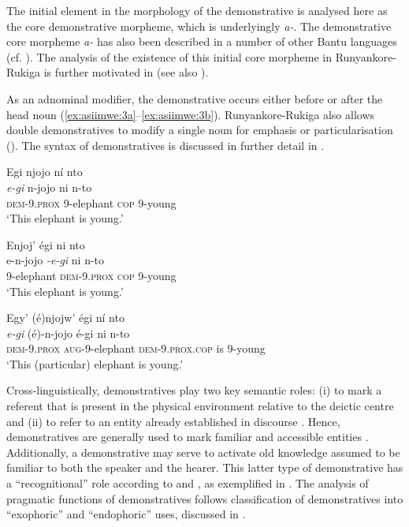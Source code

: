 \documentclass[output=paper 		  ]{langscibook}
\begin{document}
The initial element in the morphology of the demonstrative is analysed here as the core demonstrative morpheme, which is underlyingly \textit{a-}. The demonstrative core morpheme \textit{a-} has also been described in a number of other Bantu languages (cf. \citealt{Wald1973, DuPlessisEtAl1992, Visser2008}). The analysis of the existence of this initial core morpheme in Run\-yan\-ko\-re-Ru\-ki\-ga is further motivated in  (see also \citealt{Asiimwe2014,Asiimwe2016}).


\largerpage
As an adnominal modifier, the demonstrative occurs either before or after the head noun (\ref{ex:asiimwe:3a}--\ref{ex:asiimwe:3b}). Run\-yan\-ko\-re-Ru\-ki\-ga also allows double demonstratives to modify a single noun  for emphasis or particularisation (). The syntax of demonstratives is discussed in further detail in .

\ea%
    \label{ex:asiimwe:3}

    \ea\label{ex:asiimwe:3a} Egi njojo ní nto\\
    \gll \emph{e-gi}  n-jojo  ni  n-to\\
    \textsc{dem}{}-9.\textsc{prox}  9-elephant  \textsc{cop}  9-young\\
  \glt ‘This elephant is young.’

  \ex\label{ex:asiimwe:3b} Enjoj’ égi ni nto\\
    \gll e-n-jojo  \emph{{}-e-gi}  ni  n-to\\
    9-elephant  \textsc{dem}{}-9.\textsc{prox} \textsc{cop}  9-young\\
  \glt ‘This elephant is young.’

  \ex\label{ex:asiimwe:3c} Egy’ (é)njojw’ égi ní nto\\
    \gll \emph{{e}-gi}  (é)-n-jojo  é-gi  ni  n-to\\
    \textsc{dem-9.prox}  \textsc{aug}{}-9-elephant  \textsc{dem-9.prox.cop}  is  9-young\\
    \glt ‘This (particular) elephant is young.’
    \z
\z

Cross-linguistically, demonstratives play two key semantic roles: (i) to mark a referent that is present in the physical environment relative to the deictic centre and (ii) to refer to an entity already established in discourse \citep[7]{Diessel1999}. Hence, demonstratives are generally used to mark familiar and accessible entities \citep{Lyons1999}. Additionally, a demonstrative may serve to activate old knowledge assumed to be familiar to both the speaker and the hearer. This latter type of demonstrative has a ``recognitional'' role according to \citet{Himmelmann1996} and \citet{Diessel1999}, as exemplified in . The analysis of pragmatic functions of demonstratives follows  classification of demonstratives into ``exophoric'' and ``endophoric'' uses, discussed in .
\end{document}
